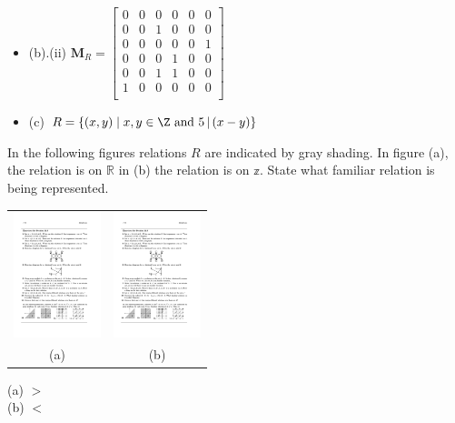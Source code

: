 \begin{questions}
\begin{solution}
\begin{itemize}
	\item[] (b).(ii)  
	$ \mathbf{M}_R = 
	\begin{bmatrix}
		0 & 0 & 0 & 0 & 0 & 0 \\
		0 & 0 & 1 & 0 & 0 & 0 \\
		0 & 0 & 0 & 0 & 0 & 1 \\
		0 & 0 & 0 & 1 & 0 & 0 \\
		0 & 0 & 1 & 1 & 0 & 0 \\
		1 & 0 & 0 & 0 & 0 & 0 \\
	\end{bmatrix}$

	\item[] (c)  $ R = \{ (x,y) \;|\;  x, y\in \Z \text{ and } 5 \,|\, (x-y) \}$
\end{itemize}
\end{solution}



 In the following figures relations $R$ are indicated by gray shading.  In figure (a), the relation is on $\mathbb{R}$ in (b) the relation is on $\mathbb{z}$.  State what familiar relation is being represented. 

\begin{tabular}{cc}
	\includegraphics[width=1in]{figs/rel1} & 
	\includegraphics[width=1in]{figs/rel3} \\
	(a) & (b) 
\end{tabular}
\ifprintanswers 
	\vspace{-10pt}
\fi 
\begin{solution}
	(a) $>$\\
	(b) $<$ 
\end{solution}





\end{questions}
